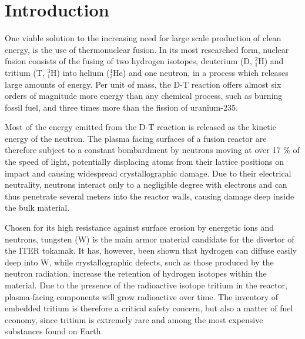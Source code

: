 \chapter{Introduction}

One viable solution to the increasing need for large scale production of clean energy, is the use of thermonuclear fusion. 
In its most researched form, nuclear fusion consists of the fusing of two hydrogen isotopes, deuterium (D, $^2_1$H) and tritium (T, $^3_1$H) into helium ($^4_2$He) and one neutron, in a process which releases large amounts of energy. 
Per unit of mass, the D-T reaction offers almost six orders of magnitude more energy than any chemical process, such as burning fossil fuel, and three times more than the fission of uranium-235.  

Most of the energy emitted from the D-T reaction is released as the kinetic energy of the neutron. 
The plasma facing surfaces of a fusion reactor are therefore subject to a constant bombardment by neutrons moving at over 17 \% of the speed of light, potentially displacing atoms from their lattice positions on impact and causing widespread crystallographic damage. 
Due to their electrical neutrality, neutrons interact only to a negligible degree with electrons and can thus penetrate several meters into the reactor walls, causing damage deep inside the bulk material. 

Chosen for its high resistance against surface erosion by energetic ions and neutrons, tungsten (W) is the main armor material candidate for the divertor of the ITER tokamak. %
It has, however, been shown that hydrogen can diffuse easily deep into W, while crystallographic defects, such as those produced by the neutron radiation, increase the retention of hydrogen isotopes within the material. \cite{tanabe2014review} 
Due to the presence of the radioactive isotope tritium in the reactor, plasma-facing components will grow radioactive over time. 
The inventory of embedded tritium is therefore a critical safety concern, but also a matter of fuel economy, since tritium is extremely rare and among the most expensive substances found on Earth.

